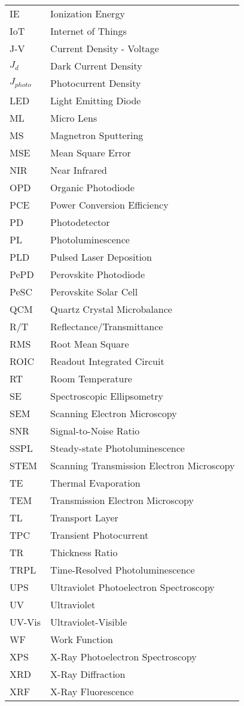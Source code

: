 \begin{longtable}{l p{}}
IE & Ionization Energy \\
IoT & Internet of Things \\
J-V & Current Density - Voltage \\
$J_d$ & Dark Current Density \\
$J_{photo}$ & Photocurrent Density \\
LED & Light Emitting Diode \\
ML & Micro Lens \\
MS & Magnetron Sputtering \\
MSE & Mean Square Error \\
NIR & Near Infrared \\
OPD & Organic Photodiode \\
PCE & Power Conversion Efficiency \\
PD & Photodetector \\
PL  & Photoluminescence \\
PLD & Pulsed Laser Deposition \\
PePD  & Perovskite Photodiode \\
PeSC & Perovskite Solar Cell \\
QCM & Quartz Crystal Microbalance \\
R/T & Reflectance/Transmittance \\
RMS & Root Mean Square \\
ROIC & Readout Integrated Circuit \\
RT  & Room Temperature \\
SE & Spectroscopic Ellipsometry \\
SEM  & Scanning Electron Microscopy \\
SNR & Signal-to-Noise Ratio \\
SSPL & Steady-state Photoluminescence \\
STEM & Scanning Transmission Electron Microscopy \\
TE & Thermal Evaporation \\
TEM & Transmission Electron Microscopy \\
TL & Transport Layer \\
TPC & Transient Photocurrent \\
TR & Thickness Ratio \\
TRPL & Time-Resolved Photoluminescence \\
UPS & Ultraviolet Photoelectron Spectroscopy \\
UV & Ultraviolet \\
UV-Vis & Ultraviolet-Visible \\
WF & Work Function \\
XPS & X-Ray Photoelectron Spectroscopy \\
XRD & X-Ray Diffraction \\
XRF & X-Ray Fluorescence \\
\end{longtable}
\cleardoublepage

